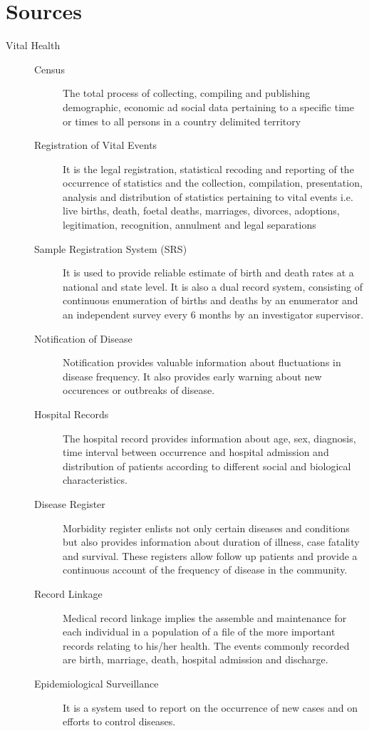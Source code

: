 \documentclass[
10pt, %
a4paper, %
]{report}
\begin{document}
\section*{Sources}
\begin{description}
\item[Vital Health]
\begin{description}
\item[]
\item[Census] The total process of collecting, compiling and publishing demographic, economic ad social data pertaining to a specific time or times to all persons in a country delimited territory
\item[Registration of Vital Events] It is the legal registration, statistical recoding and reporting of the occurrence of statistics and the collection, compilation, presentation, analysis and distribution of statistics pertaining to vital events i.e. live births, death, foetal deaths, marriages, divorces, adoptions, legitimation, recognition, annulment and legal separations
\item[Sample Registration System (SRS)] It is used to provide reliable estimate of birth and death rates at a national and state level. It is also a dual record system, consisting of continuous enumeration of births and deaths by an enumerator and an independent survey every 6 months by an investigator supervisor.
\item[Notification of Disease] Notification provides valuable information about fluctuations in disease frequency. It also provides early warning about new occurences or outbreaks of disease.
\item[Hospital Records] The hospital record provides information about age, sex, diagnosis, time interval between occurrence and hospital admission and distribution of patients according to different social and biological characteristics.
\item[Disease Register] Morbidity register enlists not only certain diseases and conditions but also provides information about duration of illness, case fatality and survival. These registers allow follow up patients and provide a continuous account of the frequency of disease in the community.
\item[Record Linkage] Medical record linkage implies the assemble and maintenance for each individual in a population of a file of the more important records relating to his/her health. The events commonly recorded are birth, marriage, death, hospital admission and discharge.
\item[Epidemiological Surveillance] It is a system used to report on the occurrence of new cases and on efforts to control diseases.

\end{description}
\end{description}
\end{document}

